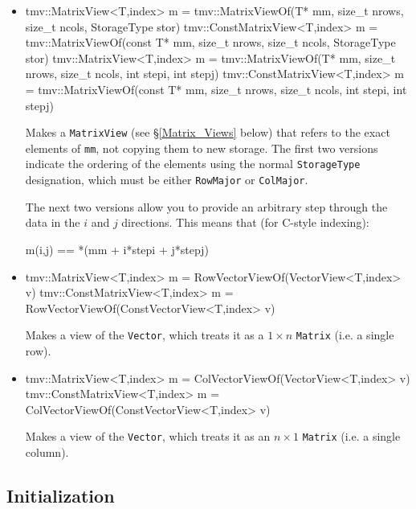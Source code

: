 \documentclass[twoside,letterpaper,11pt]{article}
\renewcommand{\tt}[1]{{\lstinline {#1}}}
\begin{document}
\begin{itemize}
\item
\begin{tmvcode}
tmv::MatrixView<T,index> m = 
      tmv::MatrixViewOf(T* mm, size_t nrows, size_t ncols, 
      StorageType stor)
tmv::ConstMatrixView<T,index> m = 
      tmv::MatrixViewOf(const T* mm,  size_t nrows, size_t ncols, 
      StorageType stor)
tmv::MatrixView<T,index> m = 
      tmv::MatrixViewOf(T* mm, size_t nrows, size_t ncols, 
      int stepi, int stepj)
tmv::ConstMatrixView<T,index> m = 
      tmv::MatrixViewOf(const T* mm,  size_t nrows, size_t ncols, 
      int stepi, int stepj)
\end{tmvcode}
Makes a \tt{MatrixView} (see \S\ref{Matrix_Views} below) that refers to the exact
elements of \tt{mm}, not copying them to new storage.  The first two versions
indicate the ordering of the elements using the normal \tt{StorageType}
designation, which must be either \tt{RowMajor} or \tt{ColMajor}.
  
The next two versions allow you to provide an arbitrary step through
the data in the $i$ and $j$ directions.  This means that (for C-style indexing):
\begin{tmvcode}
m(i,j) == *(mm + i*stepi + j*stepj)
\end{tmvcode}

\item
\begin{tmvcode}
tmv::MatrixView<T,index> m = 
      RowVectorViewOf(VectorView<T,index> v)
tmv::ConstMatrixView<T,index> m = 
      RowVectorViewOf(ConstVectorView<T,index> v)
\end{tmvcode}
Makes a view of the \tt{Vector}, which treats it as a $1\times n$ \tt{Matrix}
(i.e. a single row).  

\item
\begin{tmvcode}
tmv::MatrixView<T,index> m = 
      ColVectorViewOf(VectorView<T,index> v)
tmv::ConstMatrixView<T,index> m = 
      ColVectorViewOf(ConstVectorView<T,index> v)
\end{tmvcode}
Makes a view of the \tt{Vector}, which treats it as an $n \times 1$ \tt{Matrix}
(i.e. a single column).  

\end{itemize}

\subsection{Initialization}
\label{Matrix_Initialization}
\end{document}
